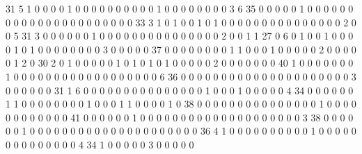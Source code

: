     31     5     1     0     0     0     0     1     0     0     0     0     0     0     0     0     0     0     1     0     0     0     0     0     0     0     0     3
     6    35     0     0     0     0     0     1     0     0     0     0     0     0     0     0     0     0     0     0     0     0     0     0     0     0     0     0
     0     0    33     3     1     0     1     0     0     1     0     1     0     0     0     0     0     0     0     0     0     0     0     0     0     0     0     2
     0     0     5    31     3     0     0     0     0     0     0     1     0     0     0     0     0     0     0     0     0     0     0     0     0     0     0     2
     0     0     1     1    27     0     6     0     1     0     0     1     0     0     0     0     1     0     1     0     0     0     0     0     0     0     0     3
     0     0     0     0     0    37     0     0     0     0     0     0     0     0     1     1     0     0     0     1     0     0     0     0     0     2     0     0
     0     0     0     1     2     0    30     2     0     1     0     0     0     0     0     1     0     1     0     1     0     1     0     0     0     0     0     2
     0     0     0     0     0     0     0    40     1     0     0     0     0     0     0     0     1     0     0     0     0     0     0     0     0     0     0     0
     0     0     0     0     0     0     0     6    36     0     0     0     0     0     0     0     0     0     0     0     0     0     0     0     0     0     0     0
     0     0     3     0     0     0     0     0     0    31     1     6     0     0     0     0     0     0     0     0     0     0     0     0     0     0     0     1
     0     0     0     1     0     0     0     0     0     4    34     0     0     0     0     0     0     1     1     0     0     0     0     0     0     0     0     1
     0     0     0     1     1     0     0     0     0     1     0    38     0     0     0     0     0     0     0     0     0     0     0     0     0     0     0     1
     0     0     0     0     0     0     0     0     0     0     0     0    41     0     0     0     0     0     0     1     0     0     0     0     0     0     0     0
     0     0     0     0     0     0     0     0     0     0     0     0     3    38     0     0     0     0     0     0     1     0     0     0     0     0     0     0
     0     0     0     0     0     0     0     0     0     0     0     0     0     0    36     4     1     0     0     0     0     0     0     0     0     0     0     1
     0     0     0     0     0     0     0     0     0     0     0     0     0     0     4    34     1     0     0     0     0     0     3     0     0     0     0     0
